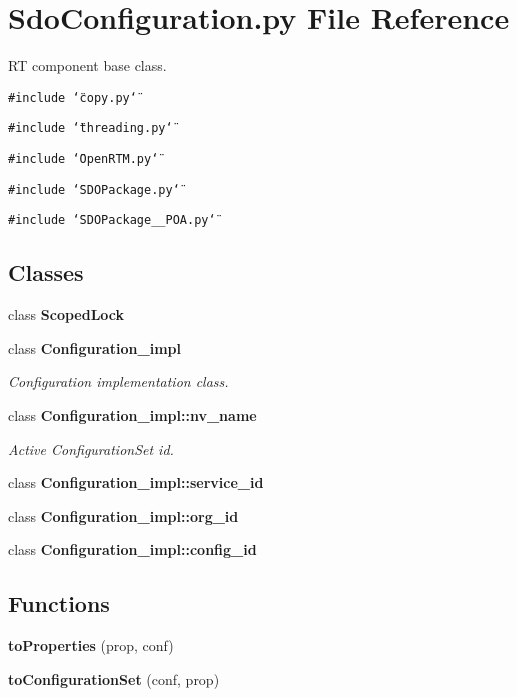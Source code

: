 \section{Sdo\-Configuration.py File Reference}
\label{SdoConfiguration_8py}
RT component base class. 

{\tt \#include \char`\"{}copy.py\char`\"{}}\par
{\tt \#include \char`\"{}threading.py\char`\"{}}\par
{\tt \#include \char`\"{}Open\-RTM.py\char`\"{}}\par
{\tt \#include \char`\"{}SDOPackage.py\char`\"{}}\par
{\tt \#include \char`\"{}SDOPackage\_\-\_\-POA.py\char`\"{}}\par
\subsection*{Classes}
\begin{CompactItemize}
\item 
class {\bf Scoped\-Lock}
\item 
class {\bf Configuration\_\-impl}
\begin{CompactList}\small\item\em Configuration implementation class. \item\end{CompactList}\item 
class {\bf Configuration\_\-impl::nv\_\-name}
\begin{CompactList}\small\item\em Active Configuration\-Set id. \item\end{CompactList}\item 
class {\bf Configuration\_\-impl::service\_\-id}
\item 
class {\bf Configuration\_\-impl::org\_\-id}
\item 
class {\bf Configuration\_\-impl::config\_\-id}
\end{CompactItemize}
\subsection*{Functions}
\begin{CompactItemize}
\item 
{\bf to\-Properties} (prop, conf)
\item 
{\bf to\-Configuration\-Set} (conf, prop)
\end{CompactItemize}


